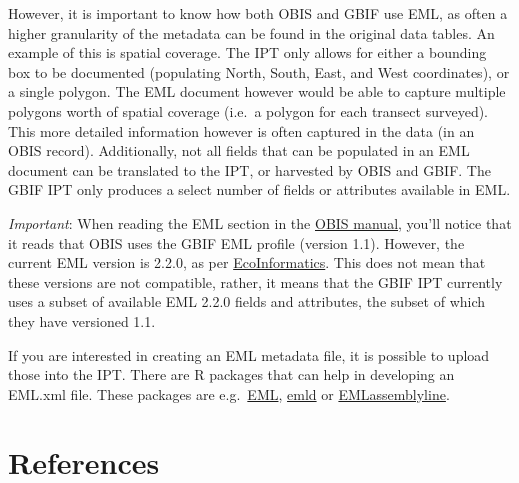 \documentclass[
]{book}
\begin{document}
However, it is important to know how both OBIS and GBIF use EML, as often a higher granularity of the metadata can be found in the original data tables. An example of this is spatial coverage. The IPT only allows for either a bounding box to be documented (populating North, South, East, and West coordinates), or a single polygon. The EML document however would be able to capture multiple polygons worth of spatial coverage (i.e.~a polygon for each transect surveyed). This more detailed information however is often captured in the data (in an OBIS record). Additionally, not all fields that can be populated in an EML document can be translated to the IPT, or harvested by OBIS and GBIF. The GBIF IPT only produces a select number of fields or attributes available in EML.

\emph{Important}: When reading the EML section in the \href{https://obis.org/manual/eml/}{OBIS manual}, you'll notice that it reads that OBIS uses the GBIF EML profile (version 1.1). However, the current EML version is 2.2.0, as per \href{https://eml.ecoinformatics.org/}{EcoInformatics}. This does not mean that these versions are not compatible, rather, it means that the GBIF IPT currently uses a subset of available EML 2.2.0 fields and attributes, the subset of which they have versioned 1.1.

If you are interested in creating an EML metadata file, it is possible to upload those into the IPT. There are R packages that can help in developing an EML.xml file. These packages are e.g.~\href{https://github.com/ropensci/EML}{EML}, \href{https://github.com/ropensci/emld}{emld} or \href{https://ediorg.github.io/EMLassemblyline/articles/overview.html}{EMLassemblyline}.

\hypertarget{references}{%
\chapter*{References}\label{references}}

\setlength{\parindent}{-0.2in}
\setlength{\leftskip}{0.2in}
\setlength{\parskip}{8pt}

\noindent
\end{document}
